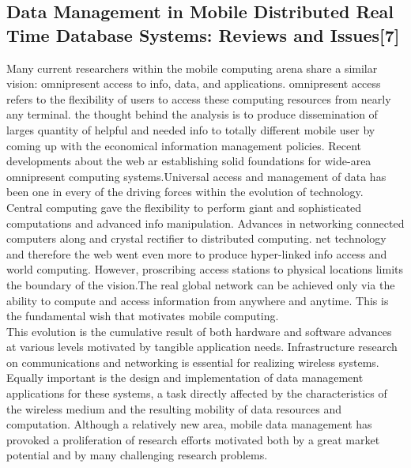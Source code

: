 \documentclass[12pt, a4paper]{article}
\begin{document}
\vspace{5mm}
\subsection{Data Management in Mobile Distributed Real Time Database Systems: Reviews and Issues[7]}

\vspace{5mm}
Many current researchers within the mobile computing arena share a similar vision: omnipresent access to info, data, and applications. omnipresent access refers to the flexibility of users to access these computing resources from nearly any terminal. the thought behind the analysis is to produce dissemination of larges quantity of helpful and needed info to totally different mobile user by coming up with the economical information management policies. Recent developments about the web ar establishing solid foundations for wide-area omnipresent computing systems.Universal access and management of data has been one in every of the driving forces within the evolution of technology.\\ 

\hspace{5mm}Central computing gave the flexibility to perform giant and sophisticated computations and advanced info manipulation. Advances in networking connected computers along and crystal rectifier to distributed computing. net technology and therefore the web went even more to produce hyper-linked info access and world computing. However, proscribing access stations to physical locations limits the boundary of the vision.The real global network can be achieved only via the ability to compute and access information from anywhere and anytime. This is the fundamental wish that motivates mobile computing. \\ 

\hspace{5mm}This evolution is the cumulative result of both hardware and software advances at various levels motivated by tangible application needs. Infrastructure research on communications and networking is essential for realizing wireless systems. Equally important is the design and implementation of data management applications for these systems, a task directly affected by the characteristics of the wireless medium and the resulting mobility of data resources and computation. Although a relatively new area, mobile data management has provoked a proliferation of research efforts motivated both by a great market potential and by many challenging research problems. 
\\
\end{document}
